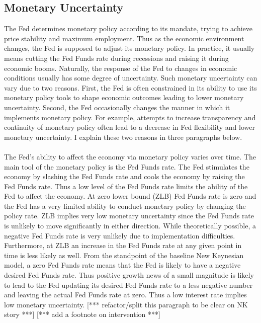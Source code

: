 \documentclass[12pt]{article}
\begin{document}
\subsection{Monetary Uncertainty} \label{sec:Model}

The Fed determines monetary policy according to its mandate, trying to achieve price stability and maximum employment. Thus as the economic environment changes, the Fed is supposed to adjust its monetary policy. In practice, it usually means cutting the Fed Funds rate during recessions and raising it during economic booms. Naturally, the response of the Fed to changes in economic conditions usually has some degree of uncertainty. Such monetary uncertainty can vary due to two reasons. First, the Fed is often constrained in its ability to use its monetary policy tools to shape economic outcomes leading to lower monetary uncertainty. Second, the Fed occasionally changes the manner in which it implements monetary policy. For example, attempts to increase transparency and continuity of monetary policy often lead to a decrease in Fed flexibility and lower monetary uncertainty. I explain these two reasons in three paragraphs below.
\paragraph{}
The Fed's ability to affect the economy via monetary policy varies over time. The main tool of the monetary policy is the Fed Funds rate. The Fed stimulates the economy by slashing the Fed Funds rate and cools the economy by raising the Fed Funds rate. Thus a low level of the Fed Funds rate limits the ability of the Fed to affect the economy. At zero lower bound (ZLB) Fed Funds rate is zero and the Fed has a very limited ability to conduct monetary policy by changing the policy rate. ZLB implies very low monetary uncertainty since the Fed Funds rate is unlikely to move significantly in either direction. While theoretically possible, a negative Fed Funds rate is very unlikely due to implementation difficulties. Furthermore, at ZLB an increase in the Fed Funds rate at any given point in time is less likely as well. From the standpoint of the baseline New Keynesian model, a zero Fed Funds rate means that the Fed is likely to have a negative desired Fed Funds rate. Thus positive growth news of a small magnitude is likely to lead to the Fed updating its desired Fed Funds rate to a less negative number and leaving the actual Fed Funds rate at zero. Thus a low interest rate implies low monetary uncertainty. 
[*** refactor/split this paragraph to be clear on NK story ***]
[*** add a footnote on intervention ***]
\end{document}
